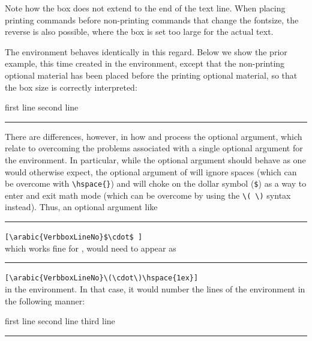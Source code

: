 \documentclass{article}
\newcommand\rl{\rule{1em}{0in}}
\begin{document}
\begin{myverbbox}{\myvb}
Note how the box does not extend to the end of the text line.  When
placing printing commands before non-printing commands that change the
fontsize, the reverse is also possible, where the box is set too large
for the actual text.

The {\myvrbox} environment behaves identically in this regard.  Below we
show the prior example, this time created in the {\myvrbox} environment,
except that the non-printing optional material has been placed before
the printing optional material, so that the box size is correctly
interpreted:

\begin{myverbbox}{\mybox}
first line
second line
\end{myverbbox}
\rl\fbox{\mybox}

There are differences, however, in how {\vrbox} and {\myvrbox} process
the optional argument, which relate to overcoming the problems
associated with a single optional argument for the {\vrbox} environment.
In particular, while the {\myvrbox} optional argument should behave as
one would otherwise expect, the optional argument of {\vrbox} will
ignore spaces (which can be overcome with \verb|\hspace{}|) and will
choke on the dollar symbol (\verb|$|) as a way to enter and exit math 
mode (which can be overcome by using the \verb|\(|\ \verb|\)| syntax 
instead).  Thus, an optional argument like\\
  \rl\verb|[\arabic{VerbboxLineNo}$\cdot$ ]|\\
which works fine for \myvrbox,  would need to appear as\\
  \rl\verb|[\arabic{VerbboxLineNo}\(\cdot\)\hspace{1ex}]|\\
in the {\vrbox} environment.  In that case, it would number the lines of
the environment in the following manner:

\begin{verbbox}
first line
second line
third line
\end{verbbox}
\rl\theverbbox


\end{myverbbox}
\end{document}
